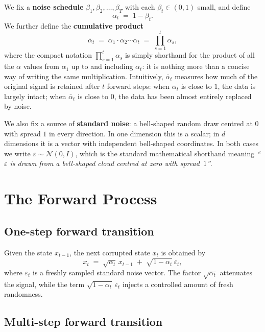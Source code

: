 \documentclass[11pt]{article}
\begin{document}
We fix a \textbf{noise schedule} $\beta_1, \beta_2, \ldots, \beta_T$ with each $\beta_t \in (0,1)$ small, and define
\[
  \alpha_t \;=\; 1 - \beta_t.
\]
We further define the \textbf{cumulative product}
\[
  \bar{\alpha}_t
  \;=\; \alpha_1 \cdot \alpha_2 \cdots \alpha_t
  \;=\; \prod_{s=1}^{t} \alpha_s,
\]
where the compact notation $\prod_{s=1}^{t} \alpha_s$ is simply shorthand for the product of all the $\alpha$ values from $\alpha_1$ up to and including $\alpha_t$: it is nothing more than a concise way of writing the same multiplication.
Intuitively, $\bar{\alpha}_t$ measures how much of the original signal is retained after $t$ forward steps: when $\bar{\alpha}_t$ is close to $1$, the data is largely intact; when $\bar{\alpha}_t$ is close to $0$, the data has been almost entirely replaced by noise.

We also fix a source of \textbf{standard noise}: a bell-shaped random draw centred at $0$ with spread $1$ in every direction.
In one dimension this is a scalar; in $d$ dimensions it is a vector with independent bell-shaped coordinates.
In both cases we write $\varepsilon \sim \mathcal{N}(0, I)$, which is the standard mathematical shorthand meaning \emph{``$\varepsilon$ is drawn from a bell-shaped cloud centred at zero with spread~$1$''}.

\section{The Forward Process}

\subsection*{One-step forward transition}

Given the state $x_{t-1}$, the next corrupted state $x_t$ is obtained by
\[
  x_t \;=\; \sqrt{\alpha_t}\,x_{t-1} \;+\; \sqrt{1-\alpha_t}\,\varepsilon_t,
\]
where $\varepsilon_t$ is a freshly sampled standard noise vector.
The factor $\sqrt{\alpha_t}$ attenuates the signal, while the term $\sqrt{1-\alpha_t}\,\varepsilon_t$ injects a controlled amount of fresh randomness.

\subsection*{Multi-step forward transition}
\end{document}
